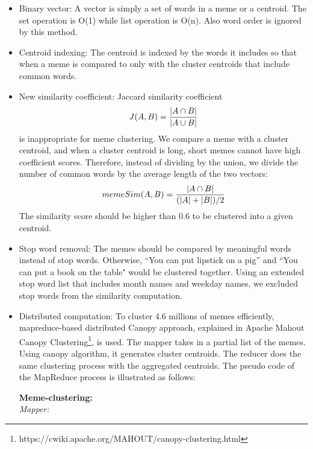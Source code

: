 \documentclass{sig-alternate}
\begin{document}
\begin{itemize}
 \item Binary vector: A vector is simply a set of words in a meme or a centroid. The set operation is O(1) while list operation is O(n). Also word order is ignored by this method.
 \item Centroid indexing: The centroid is indexed by the words it includes so that when a meme is compared to only with the cluster centroids that include common words.
 \item New similarity coefficient: Jaccard similarity coefficient 
\begin{displaymath} 
 J(A,B) = {{|A \cap B|}\over{|A \cup B|}}
\end{displaymath} 
  is inappropriate for meme clustering. We compare a meme with a cluster centroid, and when a cluster centroid is long, short memes cannot have high coefficient scores. Therefore, instead of dividing by the union, we divide the number of common words by the average length of the two vectors:\\
\begin{displaymath}
memeSim (A, B) = {{|A \cap B|} \over {(|A|+|B|) / 2} }
\end{displaymath}
The similarity score should be higher than 0.6 to be clustered into a given centroid.
 
 \item Stop word removal: The memes should be compared by meaningful words instead of stop words. Otherwise, ``You can put lipstick on a pig'' and ``You can put a book on the table" would be clustered together. Using an extended stop word list that includes month names and weekday names, we excluded stop words from the similarity computation. 
 \item Distributed computation: To cluster 4.6 millions of memes efficiently, mapreduce-based distributed Canopy approach, explained in Apache Mahout Canopy Clustering\footnote{https://cwiki.apache.org/MAHOUT/canopy-clustering.html}, is used. The mapper takes in a partial list of the memes. Using canopy algorithm, it generates cluster centroids. The reducer does the same clustering process with the aggregated centroids. The pseudo code of the MapReduce process is illustrated as follows:
 

\begin{centering}
\begin{tabbing}
\textbf{Meme-clustering:}\\
\emph{Mapper:}\\


\end{tabbing}
\end{centering}
\end{itemize}
\end{document}
